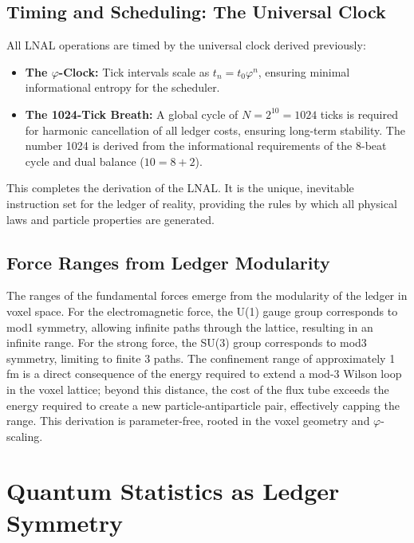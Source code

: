 \subsection{Timing and Scheduling: The Universal Clock}
All LNAL operations are timed by the universal clock derived previously:
\begin{itemize}
    \item \textbf{The \(\varphi\)-Clock:} Tick intervals scale as \(t_n = t_0 \varphi^n\), ensuring minimal informational entropy for the scheduler.
    \item \textbf{The 1024-Tick Breath:} A global cycle of \(N=2^{10}=1024\) ticks is required for harmonic cancellation of all ledger costs, ensuring long-term stability. The number 1024 is derived from the informational requirements of the 8-beat cycle and dual balance (\(10=8+2\)).
\end{itemize}
This completes the derivation of the LNAL. It is the unique, inevitable instruction set for the ledger of reality, providing the rules by which all physical laws and particle properties are generated.

\subsection{Force Ranges from Ledger Modularity}
The ranges of the fundamental forces emerge from the modularity of the ledger in voxel space. For the electromagnetic force, the U(1) gauge group corresponds to mod1 symmetry, allowing infinite paths through the lattice, resulting in an infinite range. For the strong force, the SU(3) group corresponds to mod3 symmetry, limiting to finite 3 paths. The confinement range of approximately 1 fm is a direct consequence of the energy required to extend a mod-3 Wilson loop in the voxel lattice; beyond this distance, the cost of the flux tube exceeds the energy required to create a new particle-antiparticle pair, effectively capping the range. This derivation is parameter-free, rooted in the voxel geometry and \(\varphi\)-scaling.


\section{Quantum Statistics as Ledger Symmetry}

